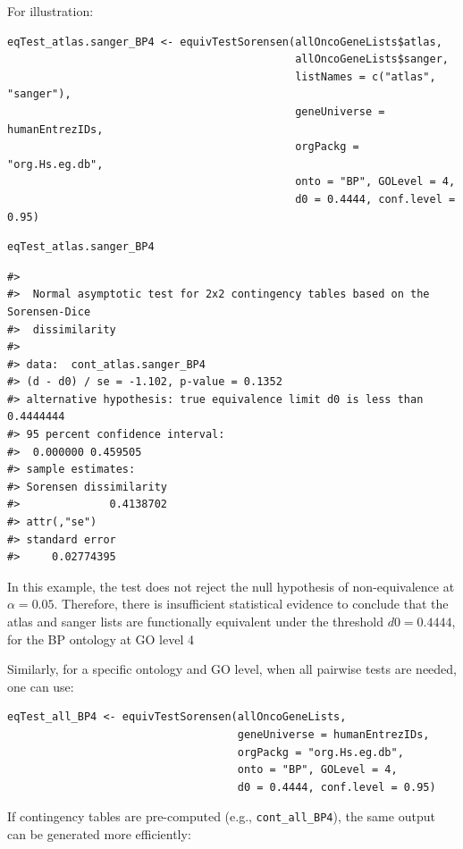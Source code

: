 For illustration:

\begin{verbatim}
eqTest_atlas.sanger_BP4 <- equivTestSorensen(allOncoGeneLists$atlas, 
                                             allOncoGeneLists$sanger,
                                             listNames = c("atlas", "sanger"),
                                             geneUniverse = humanEntrezIDs, 
                                             orgPackg = "org.Hs.eg.db", 
                                             onto = "BP", GOLevel = 4,
                                             d0 = 0.4444, conf.level = 0.95)
\end{verbatim}

\begin{verbatim}
eqTest_atlas.sanger_BP4
\end{verbatim}

\begin{verbatim}
#> 
#>  Normal asymptotic test for 2x2 contingency tables based on the Sorensen-Dice
#>  dissimilarity
#> 
#> data:  cont_atlas.sanger_BP4
#> (d - d0) / se = -1.102, p-value = 0.1352
#> alternative hypothesis: true equivalence limit d0 is less than 0.4444444
#> 95 percent confidence interval:
#>  0.000000 0.459505
#> sample estimates:
#> Sorensen dissimilarity 
#>              0.4138702 
#> attr(,"se")
#> standard error 
#>     0.02774395
\end{verbatim}

In this example, the test does not reject the null hypothesis of non-equivalence at \(\alpha = 0.05\). Therefore, there is insufficient statistical evidence to conclude that the atlas and sanger lists are functionally equivalent under the threshold \(d0 = 0.4444\), for the BP ontology at GO level 4

Similarly, for a specific ontology and GO level, when all pairwise tests are needed, one can use:

\begin{verbatim}
eqTest_all_BP4 <- equivTestSorensen(allOncoGeneLists,
                                    geneUniverse = humanEntrezIDs, 
                                    orgPackg = "org.Hs.eg.db", 
                                    onto = "BP", GOLevel = 4,
                                    d0 = 0.4444, conf.level = 0.95)
\end{verbatim}

If contingency tables are pre-computed (e.g., \texttt{cont\_all\_BP4}), the same output can be generated more efficiently:


